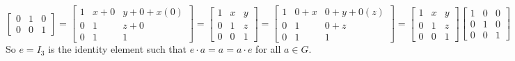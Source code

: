 \documentclass{article}
\begin{document}
\begin{description}
\begin{description}
\begin{dmath*}
\begin{bmatrix}
					0&  1&  0\\ 
					0&  0&  1
				\end{bmatrix} 
				=  
				\begin{bmatrix}
					1&  x+0&  y+0+x(0)\\ 
					0&  1&  z+0\\ 
					0&  1&  1
				\end{bmatrix} 
				= 
				\begin{bmatrix}
					1&  x&  y\\ 
					0&  1&  z\\ 
					0&  0&  1 
				\end{bmatrix}
				=  
				\begin{bmatrix}
					1&  0+x&  0+y+0(z)\\ 
					0&  1&  0+z\\ 
					0&  1&  1
				\end{bmatrix} 
				=
				\begin{bmatrix}
					1&  x&  y\\ 
					0&  1&  z\\ 
					0&  0&  1 
				\end{bmatrix}\begin{bmatrix}
				1&  0&  0\\ 
				0&  1&  0\\ 
				0&  0&  1
			\end{bmatrix} 
			\end{dmath*} So $e=I_3$ is the identity element such that $e\cdot a=a=a\cdot e$ for all $a\in G$. 
			

\end{description}
\end{description}
\end{document}
